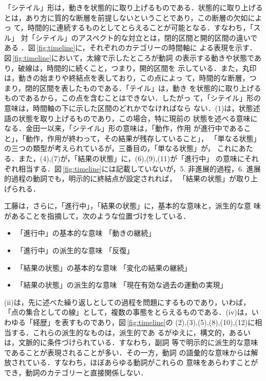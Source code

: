「シテイル」形は，動きを状態的に取り上げるものである．状態的に取り上げる
とは，あり方に質的な断層を前提しないということであり，この断層の欠如によっ
て，時間的に連続するものとしてとらえることが可能となる．すなわち，「スル」
対「シテイル」のアスペクト的な対立とは，閉的区間と開的区間の違いである
\cite{森山84}．図\,\ref{fig:timeline}に，それぞれのカテゴリーの時間軸に
よる表現を示す．図\,\ref{fig:timeline}において，太線で示したところが動詞
の表示する動きや状態であり，破線は，時間的に続くこと，つまり，開的区間を
示している．また，丸印は，動きの始まりや終結点を表しており，この点によっ
て，時間的な断層，つまり，閉的区間を表したものである．「テイル」は，動き
を状態的に取り上げるものであるから，この点を含むことはできない．したがっ
て，「シテイル」形の意味は，時間軸の下に示した区間のどれかでなければなら
ない．(1)は，状態述語の状態を取り上げるものであり，この場合，特に現前の
状態を述べる意味になる．金田一以来，「シテイル」形の意味は，「動作，作用
が進行中であること」，「動作，作用が終わって，その結果が残存していること」，
「単なる状態」の三つの類型が考えられているが，三番目の，「単なる状態」が，
これにあたる．また，(4),(7)が，「結果の状態」に，(6),(9),(11)が「進行中」
の意味にそれぞれ相当する．図\,\ref{fig:timeline}には記載していないが，5.
非進展的過程，6.  進展的過程の動詞でも，明示的に終結点が設定されれば，
「結果の状態」が取り上げられる．

工藤は，さらに，「進行中」，「結果の状態」に，基本的な意味と，派生的な意
味があることを指摘して，次のような位置づけをしている\cite{工藤82}．
\begin{itemize}
\item[(i)]   「進行中」の基本的な意味 「動きの継続」
\item[(ii)]  「進行中」の派生的な意味 「反復」
\item[(iii)] 「結果の状態」の基本的な意味 「変化の結果の継続」
\item[(iv)]  「結果の状態」の派生的な意味 「現在有効な過去の運動の実現」
\end{itemize}

(ii)は，先に述べた繰り返しとしての過程を問題にするものであり，いわば，
「点の集合としての線」として，複数の事態をとらえるものである．(iv)は，い
わゆる「経歴」を表すものであり，図\,\ref{fig:timeline}の
(2),(3),(5),(8),(10),(12)に相当する．これらの派生的なものは，派生的であ
るがゆえに，構文的，あるいは，文脈的に条件づけられている．すなわち，副詞
等で明示的に派生的な意味であることが表現されることが多い．その一方，動詞
の語彙的な意味からは解放されている．すなわち，ほぼあらゆる動詞がこれらの
意味をあらわすことができ，動詞のカテゴリーと直接関係しない．

